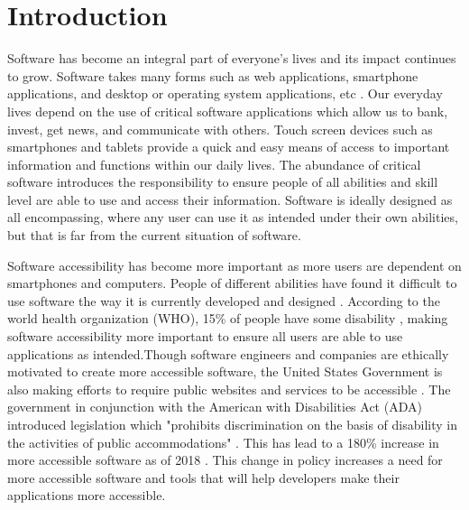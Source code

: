 
\section{Introduction}
\label{sec:introduction}

Software has become an integral part of everyone's lives and its impact continues to grow. Software takes many forms such as web applications, smartphone applications, and desktop or operating system applications, etc \cite{7}. Our everyday lives depend on the use of critical software applications which allow us to bank, invest, get news, and communicate with others. Touch screen devices such as smartphones and tablets provide a quick and easy means of access to important information and functions within our daily lives. The abundance of critical software introduces the responsibility to ensure people of all abilities and skill level are able to use and access their information. Software is ideally designed as all encompassing, where any user can use it as intended under their own abilities, but that is far from the current situation of software.

Software accessibility has become more important as more users are dependent on smartphones and computers. People of different abilities have found it difficult to use software the way it is currently developed and designed \cite{11}. According to the world health organization (WHO), 15\% of people have some disability \cite{28}, making software accessibility more important to ensure all users are able to use applications as intended.Though software engineers and companies are ethically motivated to create more accessible software, the United States Government is also making efforts to require public websites and services to be accessible \cite{23}. The government in conjunction with the American with Disabilities Act (ADA) introduced legislation which "prohibits discrimination on the basis of disability in the activities of public accommodations" \cite{23,16}. This has lead to a 180\% increase in more accessible software as of 2018 \cite{27}. This change in policy increases a need for more accessible software and tools that will help developers make their applications more accessible.

